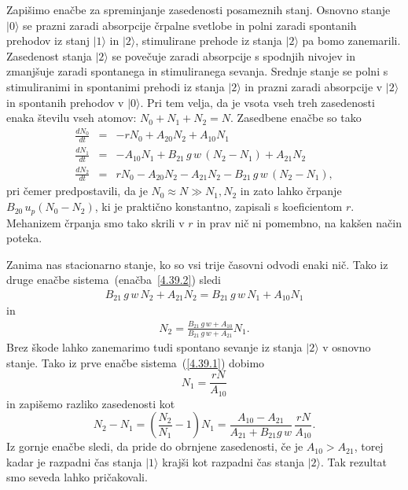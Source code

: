 Zapišimo enačbe za spreminjanje zasedenosti posameznih stanj. Osnovno stanje
$|0\rangle$ se prazni zaradi absorpcije črpalne svetlobe in polni zaradi
spontanih prehodov iz stanj $|1\rangle$ in $|2\rangle$, stimulirane
prehode iz stanja $|2\rangle$ pa bomo zanemarili. Zasedenost stanja $|2\rangle$ se
povečuje zaradi absorpcije s spodnjih nivojev in zmanjšuje
zaradi spontanega in stimuliranega sevanja. Srednje stanje se polni
s stimuliranimi in spontanimi prehodi iz stanja $|2\rangle$ in prazni
zaradi absorpcije v $|2\rangle$ in spontanih prehodov v $|0\rangle$.
Pri tem velja, da je vsota vseh treh zasedenosti enaka številu vseh atomov: $N_{0}+N_{1}+N_{2}=N$. 
Zasedbene enačbe so tako
\begin{eqnarray}
\frac{dN_{0}}{dt} & = & -rN_0+A_{20}N_{2}+A_{10}N_{1} \label{4.39.1}\\
\frac{dN_{1}}{dt} & = & -A_{10}N_{1}+B_{21}\,g\,w\, (N_{2}-N_{1})+A_{21}N_{2} \label{4.39.2}\\
\frac{dN_{2}}{dt} & = & rN_0-A_{20}N_{2}-A_{21}N_{2}-B_{21}\,g\,w\, (N_2-N_1),
\label{4.39}
\end{eqnarray}
pri čemer predpostavili, da je $N_0 \approx N \gg N_1, N_2$ in zato lahko črpanje $B_{20}\, 
u_{p} (N_0-N_2)$, ki je praktično konstantno, zapisali s koeficientom $r$. Mehanizem črpanja 
smo tako skrili v $r$ in prav nič ni pomembno, na kakšen način poteka.

Zanima nas stacionarno stanje, ko so vsi trije časovni odvodi enaki nič. 
Tako iz druge enačbe sistema~(enačba~\ref{4.39.2}) sledi
\begin{eqnarray}
B_{21}\,g\,w\, N_{2}+A_{21}N_{2} = B_{21}\,g\,w\, N_{1} + A_{10}N_{1} 
\end{eqnarray}
in
\begin{eqnarray}
N_2 = \frac{B_{21}\,g\,w + A_{10}}{B_{21}\,g\,w+A_{21}}N_1.  
\end{eqnarray}
Brez škode lahko zanemarimo tudi spontano sevanje iz stanja
$|2\rangle$ v osnovno stanje. Tako iz prve enačbe sistema~(\ref{4.39.1}) dobimo 
\begin{equation}
N_1= \frac{rN}{A_{10}}
\end{equation}
in zapišemo razliko zasedenosti kot 
\begin{equation}
N_{2}-N_{1}=\left(\frac{N_2}{N_1}-1\right)N_1=\frac{A_{10}-A_{21}}{A_{21}+
B_{21}g\,w} \,\frac{rN}{A_{10}}.
\label{4.42}
\end{equation}
Iz gornje enačbe sledi, da pride do obrnjene 
zasedenosti, če je $A_{10}>A_{21}$, torej kadar je
razpadni čas stanja $|1\rangle$ krajši kot razpadni čas stanja $|2\rangle$.
Tak rezultat smo seveda lahko pričakovali.

